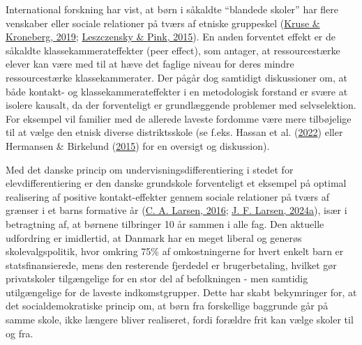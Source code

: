 \documentclass[
]{book}
\begin{document}
International forskning har vist, at børn i såkaldte ``blandede skoler'' har flere venskaber eller sociale relationer på tværs af etniske gruppeskel (\protect\hyperlink{ref-kruse2019}{Kruse \& Kroneberg, 2019}; \protect\hyperlink{ref-leszczensky2015}{Leszczensky \& Pink, 2015}). En anden forventet effekt er de såkaldte klassekammerateffekter (peer effect), som antager, at ressourcestærke elever kan være med til at hæve det faglige niveau for deres mindre ressourcestærke klassekammerater. Der pågår dog samtidigt diskussioner om, at både kontakt- og klassekammerateffekter i en metodologisk forstand er svære at isolere kausalt, da der forventeligt er grundlæggende problemer med selvselektion. For eksempel vil familier med de allerede laveste fordomme være mere tilbøjelige til at vælge den etnisk diverse distriktsskole (se f.eks. Hassan et al. (\protect\hyperlink{ref-hassan2022}{2022}) eller Hermansen \& Birkelund (\protect\hyperlink{ref-hermansen2015}{2015}) for en oversigt og diskussion).

Med det danske princip om undervisningsdifferentiering i stedet for elevdifferentiering er den danske grundskole forventeligt et eksempel på optimal realisering af positive kontakt-effekter gennem sociale relationer på tværs af grænser i et barns formative år (\protect\hyperlink{ref-larsen2016}{C. A. Larsen, 2016}; \protect\hyperlink{ref-larsen2024a}{J. F. Larsen, 2024a}), især i betragtning af, at børnene tilbringer 10 år sammen i alle fag. Den aktuelle udfordring er imidlertid, at Danmark har en meget liberal og generøs skolevalgspolitik, hvor omkring 75\% af omkostningerne for hvert enkelt barn er statsfinansierede, mens den resterende fjerdedel er brugerbetaling, hvilket gør privatskoler tilgængelige for en stor del af befolkningen - men samtidig utilgængelige for de laveste indkomstgrupper. Dette har skabt bekymringer for, at det socialdemokratiske princip om, at børn fra forskellige baggrunde går på samme skole, ikke længere bliver realiseret, fordi forældre frit kan vælge skoler til og fra.
\end{document}

